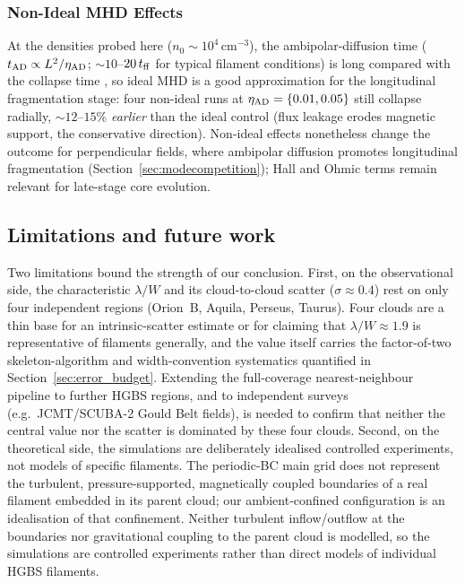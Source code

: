 \documentclass[usenatbib,twoside,twocolumn]{mnras}
\begin{document}
\subsubsection{Non-Ideal MHD Effects}
\label{sec:nonideal}

At the densities probed here ($n_0\sim10^4$\,cm$^{-3}$), the ambipolar-diffusion time ($t_{\rm AD}\propto L^2/\eta_{\rm AD}$; $\sim10$--$20\,t_{\rm ff}$ for typical filament conditions) is long compared with the collapse time \citep{Tassis2004}, so ideal MHD is a good approximation for the longitudinal fragmentation stage: four non-ideal runs at $\eta_{\rm AD}=\{0.01,0.05\}$ still collapse radially, $\sim12$--$15\%$ \textit{earlier} than the ideal control (flux leakage erodes magnetic support, the conservative direction). Non-ideal effects nonetheless change the outcome for perpendicular fields, where ambipolar diffusion promotes longitudinal fragmentation (Section~\ref{sec:modecompetition}); Hall and Ohmic terms remain relevant for late-stage core evolution.

\subsection{Limitations and future work}
\label{sec:limitations}

Two limitations bound the strength of our conclusion. First, on the observational side, the characteristic $\lambda/W$ and its cloud-to-cloud scatter ($\sigma\approx0.4$) rest on only four independent regions (Orion~B, Aquila, Perseus, Taurus). Four clouds are a thin base for an intrinsic-scatter estimate or for claiming that $\lambda/W\approx1.9$ is representative of filaments generally, and the value itself carries the factor-of-two skeleton-algorithm and width-convention systematics quantified in Section~\ref{sec:error_budget}. Extending the full-coverage nearest-neighbour pipeline to further HGBS regions, and to independent surveys (e.g.\ JCMT/SCUBA-2 Gould Belt fields), is needed to confirm that neither the central value nor the scatter is dominated by these four clouds. Second, on the theoretical side, the simulations are deliberately idealised controlled experiments, not models of specific filaments. The periodic-BC main grid does not represent the turbulent, pressure-supported, magnetically coupled boundaries of a real filament embedded in its parent cloud; our ambient-confined configuration is an idealisation of that confinement. Neither turbulent inflow/outflow at the boundaries nor gravitational coupling to the parent cloud is modelled, so the simulations are controlled experiments rather than direct models of individual HGBS filaments.
\end{document}
